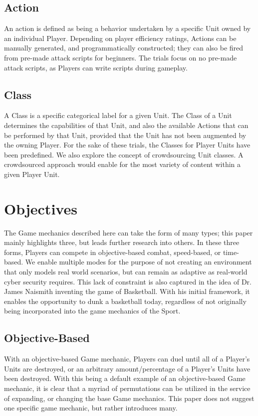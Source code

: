 \documentclass[10pt, titlepage, twocolumn]{article}
\newcommand{\ii}{\indent\indent}
\begin{document}
\subsection{Action}
\ii
An action is defined as being a behavior undertaken by a specific Unit owned by an individual Player. Depending on player efficiency ratings, Actions can be manually generated, and programmatically constructed; they can also be fired from pre-made attack scripts for beginners. The trials focus on no pre-made attack scripts, as Players can write scripts during gameplay.

\subsection{Class}
\ii
A Class is a specific categorical label for a given Unit. The Class of a Unit determines the capabilities of that Unit, and also the available Actions that can be performed by that Unit, provided that the Unit has not been augmented by the owning Player. For the sake of these trials, the Classes for Player Units have been predefined. We also explore the concept of crowdsourcing Unit classes. A crowdsourced approach would enable for the most variety of content within a given Player Unit.


\section{Objectives}
The Game mechanics described here can take the form of many types; this paper mainly highlights three, but leads further research into others. In these three forms, Players can compete in objective-based combat, speed-based, or time-based. We enable multiple modes for the purpose of not creating an environment that only models real world scenarios, but can remain as adaptive as real-world cyber security requires. This lack of constraint is also captured in the idea of Dr. James Naismith inventing the game of Basketball. With his initial framework, it enables the opportunity to dunk a basketball today, regardless of not originally being incorporated into the game mechanics of the Sport.

\subsection{Objective-Based}
\ii
With an objective-based Game mechanic, Players can duel until all of a Player's Units are destroyed, or an arbitrary amount/percentage of a Player's Units have been destroyed. With this being a default example of an objective-based Game mechanic, it is clear that a myriad of permutations can be utilized in the service of expanding, or changing the base Game mechanics. This paper does not suggest one specific game mechanic, but rather introduces many.
\end{document}
